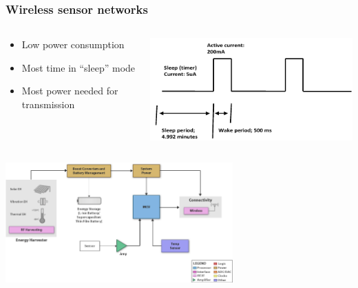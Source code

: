 \documentclass{beamer}
\begin{document}
\begin{frame}
  \frametitle{Wireless sensor networks}

\begin{columns}
 \begin{column}{.5\textwidth}
  \begin{itemize}
   \item Low power consumption
   \item Most time in ``sleep'' mode
   \item Most power needed for transmission
  \end{itemize}
 \end{column}

 \begin{column}{.5\textwidth}
  \includegraphics[width=\textwidth]{./Slike/wsn-current-profile}
 \end{column}
\end{columns}

\begin{center}
 \includegraphics[height=130pt]{./Slike/EH-Block}
\end{center}

\end{frame}
\end{document}
